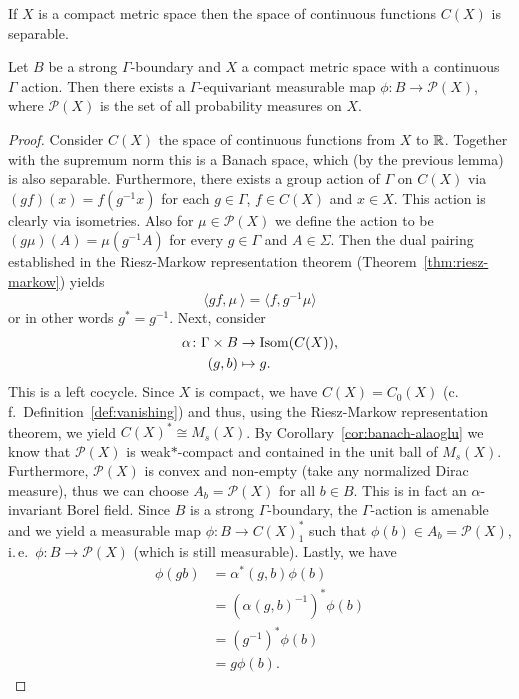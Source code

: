 \begin{lemma}
  If \(X\) is a compact metric space then the space of continuous functions \(C(X)\) is separable.
\end{lemma}

\begin{thm}
  Let \(B\) be a strong \(\Gamma\)-boundary and \(X\) a compact metric space with a continuous \(\Gamma\) action. Then there exists a \(\Gamma\)-equivariant measurable map \(\phi \colon B \to \mathcal{P}(X)\), where \(\mathcal{P}(X)\) is the set of all probability measures on \(X\).
\end{thm}

\begin{proof}
  Consider \(C(X)\) the space of continuous functions from \(X\) to \(\mathbb{R}\). Together with the supremum norm this is a Banach space, which (by the previous lemma) is also separable. Furthermore, there exists a group action of \(\Gamma\) on \(C(X)\) via \((gf)(x) = f(g^{-1}x)\) for each \(g \in \Gamma\), \(f \in C(X)\) and \(x \in X\). This action is clearly via isometries. Also for \(\mu \in \mathcal{P}(X)\) we define the action to be \((g\mu)(A) = \mu(g^{-1} A)\) for every \(g \in \Gamma\) and \(A \in \Sigma\). Then the dual pairing established in the Riesz-Markow representation theorem (Theorem~\ref{thm:riesz-markow}) yields
  \[
    \langle gf, \mu\ \rangle = \langle f, g^{-1} \mu \rangle
  \]
  or in other words \(g^\ast = g^{-1}\).
  Next, consider
  \begin{align*}
    \alpha\colon \Gamma \times B &\to \operatorname{Isom}(C(X)),\\
                 (g, b) &\mapsto g.
  \end{align*}
  This is a left cocycle.
  Since \(X\) is compact, we have \(C(X) = C_0(X)\) (c.\,f.\ Definition~\ref{def:vanishing}) and thus, using the Riesz-Markow representation theorem, we yield \(C(X)^\ast \cong M_{s}(X)\). By Corollary~\ref{cor:banach-alaoglu} we know that \(\mathcal{P}(X)\) is weak\(\ast\)-compact and contained in the unit ball of \(M_s(X)\). Furthermore, \(\mathcal{P}(X)\) is convex and non-empty (take any normalized Dirac measure), thus we can choose \(A_b = \mathcal{P}(X)\) for all \(b \in B\). This is in fact an \(\alpha\)-invariant Borel field. Since \(B\) is a strong \(\Gamma\)-boundary, the \(\Gamma\)-action is amenable and we yield a measurable map \(\phi \colon B \to C(X)^\ast_1\) such that \(\phi(b) \in A_b = \mathcal{P}(X)\), i.\,e.\ \(\phi \colon B \to \mathcal{P}(X)\) (which is still measurable). Lastly, we have
  \begin{align*}
    \phi(gb) & = \alpha^\ast(g, b) \phi(b)\\
               & = \left(\alpha(g,b)^{-1}\right)^\ast \phi(b)\\
               & = \left ( g^{-1}\right)^\ast \phi(b)\\
               & = g\phi(b).
  \end{align*}
\end{proof}

